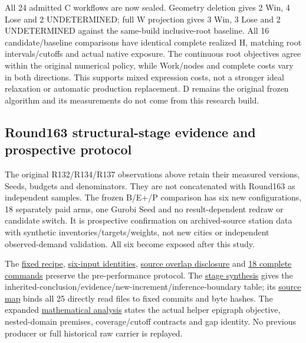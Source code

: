 \documentclass[
  american,
  11pt,
]{article}
\begin{document}
All 24 admitted C workflows are now sealed. Geometry deletion gives 2
Win, 4 Lose and 2 UNDETERMINED; full W projection gives 3 Win, 3 Lose
and 2 UNDETERMINED against the same-build inclusive-root baseline. All
16 candidate/baseline comparisons have identical complete realized H,
matching root intervals/cutoffs and actual native exposure. The
continuous root objectives agree within the original numerical policy,
while Work/nodes and complete costs vary in both directions. This
supports mixed expression costs, not a stronger ideal relaxation or
automatic production replacement. D remains the original frozen
algorithm and its measurements do not come from this research build.

\subsection{Round163 structural-stage evidence and prospective
protocol}\label{round163-structural-stage-evidence-and-prospective-protocol}

The original R132/R134/R137 observations above retain their measured
versions, Seeds, budgets and denominators. They are not concatenated
with Round163 as independent samples. The frozen B/E+/P comparison has
six new configurations, 18 separately paid arms, one Gurobi Seed and no
result-dependent redraw or candidate switch. It is prospective
confirmation on archived-source station data with synthetic
inventories/targets/weights, not new cities or independent
observed-demand validation. All six become exposed after this study.

The
\href{https://github.com/yifanXovo/TailoredExact/blob/codex/round172-journal-manuscript/results/unified_exact_round163/source_recipe.json}{fixed
recipe},
\href{https://github.com/yifanXovo/TailoredExact/blob/codex/round172-journal-manuscript/results/unified_exact_round163/input_manifest.json}{six-input
identities},
\href{https://github.com/yifanXovo/TailoredExact/blob/codex/round172-journal-manuscript/results/unified_exact_round163/source_overlap.json}{source
overlap disclosure} and
\href{https://github.com/yifanXovo/TailoredExact/blob/codex/round172-journal-manuscript/results/unified_exact_round163/matrix_frozen.json}{18
complete commands} preserve the pre-performance protocol. The
\href{https://github.com/yifanXovo/TailoredExact/blob/codex/round172-journal-manuscript/results/unified_exact_round163/structural_synthesis.md}{stage
synthesis} gives the
inherited-conclusion/evidence/new-increment/inference-boundary table;
its
\href{https://github.com/yifanXovo/TailoredExact/blob/codex/round172-journal-manuscript/results/unified_exact_round163/historical_source_map.json}{source
map} binds all 25 directly read files to fixed commits and byte hashes.
The expanded
\href{https://github.com/yifanXovo/TailoredExact/blob/codex/round172-journal-manuscript/results/unified_exact_round137/mathematical_analysis.md}{mathematical
analysis} states the actual helper epigraph objective, nested-domain
premises, coverage/cutoff contracts and gap identity. No previous
producer or full historical raw carrier is replayed.
\end{document}
